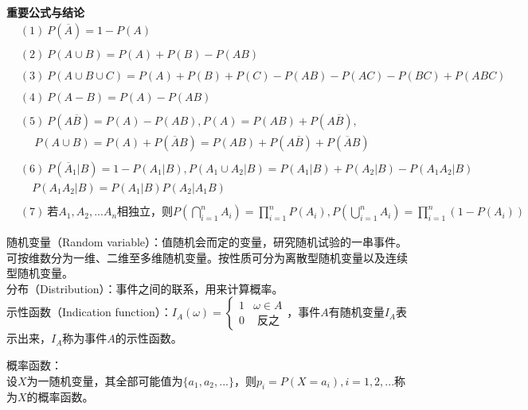 \textbf{重要公式与结论}
$$
\begin{aligned}
&(1)\ P(\overline{A})=1-P(A)\\
\\
&(2)\ P(A \cup B)=P(A)+P(B)-P(AB)\\
\\
&(3)\ P(A\cup B \cup C)=P(A)+P(B)+P(C)-P(AB)-P(AC)-P(BC)+P(ABC)\\
\\
&(4)\ P(A-B)=P(A)-P(AB)\\
\\
&(5)\ P(A\overline{B})=P(A)-P(AB),P(A)=P(AB)+P(A\overline{B}),\\
&\ \ \ \ \ \ P(A\cup B)=P(A)+P(\overline{A}B)=P(AB)+P(A\overline{B})+P(\overline{A}B)\\
\\
&(6)\ P(\overline{A}_1|B)=1-P(A_1|B),P(A_1\cup A_2|B)=P(A_1|B)+P(A_2|B)-P(A_1A_2|B)\\
&\ \ \ \ \ P(A_1A_2|B)=P(A_1|B)P(A_2|A_1B)\\
\\
&(7)\ 若A_1,A_2,...A_n相独立，则P(\bigcap_{i=1}^{n}A_i)=\prod_{i=1}^{n}P(A_i),P(\bigcup_{i=1}^{n}A_i)=\prod_{i=1}^{n}(1-P(A_i))
\end{aligned}
$$

随机变量（Random variable）：值随机会而定的变量，研究随机试验的一串事件。可按维数分为一维、二维至多维随机变量。按性质可分为离散型随机变量以及连续型随机变量。\\
分布（Distribution）：事件之间的联系，用来计算概率。\\
示性函数（Indication function）：$I_A(\omega)=\begin{cases}
    1& \omega \in A \\ 
    0& \text{ 反之}
   \end{cases}$，事件$A$有随机变量$I_A$表示出来，$I_A$称为事件$A$的示性函数。\\

\begin{definition}
  概率函数：\\
  设$X$为一随机变量，其全部可能值为$\{a_1, a_2,...\}$，则$p_i=P(X=a_i),i=1,2,...$称为$X$的概率函数。
\end{definition}

